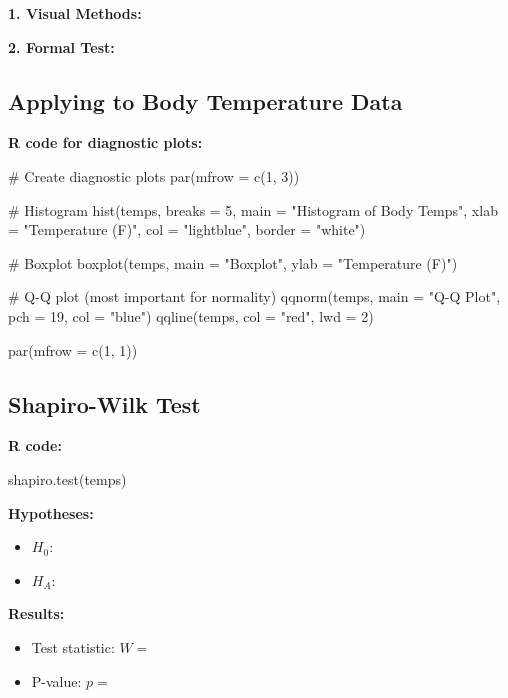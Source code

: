 \documentclass[11pt]{article}
\begin{document}
\textbf{1. Visual Methods:}

\vspace{3cm}

\textbf{2. Formal Test:}

\vspace{1cm}

\subsection*{Applying to Body Temperature Data}

\textbf{R code for diagnostic plots:}
\begin{rcode}
# Create diagnostic plots
par(mfrow = c(1, 3))

# Histogram
hist(temps, breaks = 5, main = "Histogram of Body Temps",
     xlab = "Temperature (F)", col = "lightblue", border = "white")

# Boxplot
boxplot(temps, main = "Boxplot", ylab = "Temperature (F)")

# Q-Q plot (most important for normality)
qqnorm(temps, main = "Q-Q Plot", pch = 19, col = "blue")
qqline(temps, col = "red", lwd = 2)

par(mfrow = c(1, 1))
\end{rcode}

\vspace{1cm}

\subsection*{Shapiro-Wilk Test}

\textbf{R code:}
\begin{rcode}
shapiro.test(temps)
\end{rcode}

\textbf{Hypotheses:}
\begin{itemize}
\item $H_0$:
\item $H_A$:
\end{itemize}

\vspace{1cm}

\textbf{Results:}
\begin{itemize}
\item Test statistic: $W = $
\item P-value: $p = $
\end{itemize}

\vspace{1cm}
\end{document}
